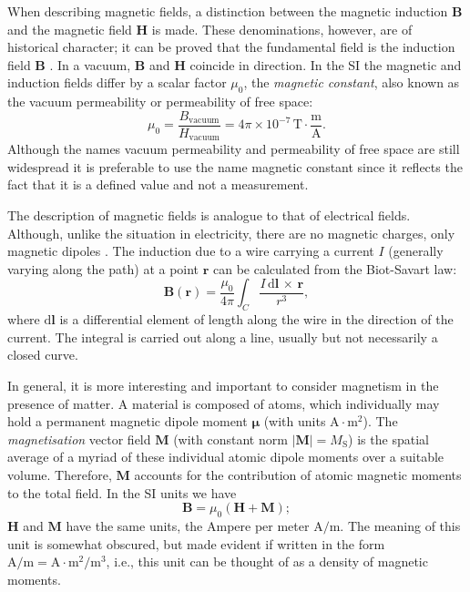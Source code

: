 When describing magnetic fields, a distinction between the magnetic induction $\boldsymbol{B}$ and the magnetic field $\boldsymbol{H}$ is made. These denominations, however, are of historical character; it can be proved that the fundamental field is the induction field $\boldsymbol{B}$ \citep{Feynman}. In a vacuum, $\boldsymbol{B}$ and $\boldsymbol{H}$ coincide in direction. In the SI the magnetic and induction fields differ by a scalar factor $\mu_0$, the \textit{magnetic constant}, also known as the vacuum permeability or permeability of free space:
\begin{equation}
\mu_0 = \frac{B_{\text{vacuum}}}{H_{\text{vacuum}}} = 4 \pi \times 10^{-7} \, \text{T}\cdot\frac{\text{m}}{\text{A}}.
\end{equation}
Although the names vacuum permeability and permeability of free space are still widespread it is preferable to use the name magnetic constant since it reflects the fact that it is a defined value and not a measurement.\par

The description of magnetic fields is analogue to that of electrical fields. Although, unlike the situation in electricity, there are no magnetic charges, only magnetic dipoles \citep{Feynman}. The induction due to a wire carrying a current $I$ (generally varying along the path) at a point $\boldsymbol{r}$ can be calculated from the Biot-Savart law:
\begin{equation}
\boldsymbol{B}(\boldsymbol{r}) = \frac{\mu_0}{4\pi} \int_C \frac{I\, \text{d}\boldsymbol{l}\, \times \, \boldsymbol{r}}{r^3},
\end{equation}
where $\text{d}\boldsymbol{l}$ is a differential element of length along the wire in the direction of the current. The integral is carried out along a line, usually but not necessarily a closed curve.\par

In general, it is more interesting and important to consider magnetism in the presence of matter. A material is composed of atoms, which individually may hold a permanent magnetic dipole moment $\boldsymbol{\mu}$ (with units $\text{A}\cdot \text{m}^2$). The \textit{magnetisation} vector field $\boldsymbol{M}$ (with constant norm $|\boldsymbol{M}|=M_\text{S}$) is the spatial average of a myriad of these individual atomic dipole moments over a suitable volume. Therefore, $\boldsymbol{M}$ accounts for the contribution of atomic magnetic moments to the total field. In the SI units we have
\begin{equation}
\boldsymbol{B} = \mu_0 (\boldsymbol{H}+\boldsymbol{M});
\end{equation}
$\boldsymbol{H}$ and $\boldsymbol{M}$ have the same units, the Ampere per meter $\text{A}/\text{m}$. The meaning of this unit is somewhat obscured, but made evident if written in the form $\text{A}/\text{m} = \text{A}\cdot\text{m}^2/\text{m}^3$, i.e., this unit can be thought of as a density of magnetic moments.\par

